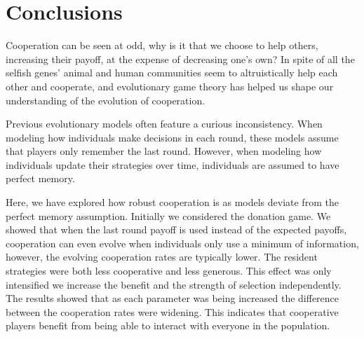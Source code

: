 \documentclass[11pt]{article}
\theoremstyle{plainCl1}
\theoremstyle{plainCl2}
\begin{document}


\section{Conclusions}\label{section:conclusions}

Cooperation can be seen at odd, why is it that we choose to help others,
increasing their payoff, at the expense of decreasing one's own? In spite of all
the selfish genes’ animal and human communities seem to altruistically help each
other and cooperate, and evolutionary game theory has helped us shape our
understanding of the evolution of cooperation.

Previous evolutionary models often feature a curious inconsistency. When
modeling how individuals make decisions in each round, these models assume that
players only remember the last round. However, when modeling how individuals
update their strategies over time, individuals are assumed to have perfect
memory.

Here, we have explored how robust cooperation is as models deviate from the
perfect memory assumption. Initially we considered the donation game. We showed
that when the last round payoff is used instead of the expected payoffs,
cooperation can even evolve when individuals only use a minimum of information,
however, the evolving cooperation rates are typically lower. The resident
strategies were both less cooperative and less generous. This effect was only
intensified we increase the benefit and the strength of selection independently.
The results showed that as each parameter was being increased the difference
between the cooperation rates were widening. This indicates that cooperative
players benefit from being able to interact with everyone in the population.
\end{document}
